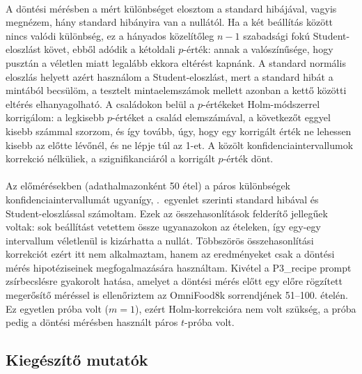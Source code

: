 \paragraph{}A döntési mérésben a mért különbséget elosztom a standard hibájával, 
vagyis megnézem, hány standard hibányira van a nullától. Ha a két beállítás 
között nincs valódi különbség, ez a hányados közelítőleg $n-1$ szabadsági fokú 
Student-eloszlást követ, ebből adódik a kétoldali $p$-érték: annak a 
valószínűsége, hogy pusztán a véletlen miatt legalább ekkora eltérést kapnánk. 
A standard normális eloszlás helyett azért használom a Student-eloszlást, mert a 
standard hibát a mintából becsülöm, a tesztelt mintaelemszámok mellett azonban a 
kettő közötti eltérés elhanyagolható. A családokon belül a $p$-értékeket 
Holm-módszerrel korrigálom: a legkisebb $p$-értéket a család elemszámával, a 
következőt eggyel kisebb számmal szorzom, és így tovább, úgy, hogy egy korrigált 
érték ne lehessen kisebb az előtte lévőnél, és ne lépje túl az 1-et. A közölt 
konfidenciaintervallumok korrekció nélküliek, a szignifikanciáról a korrigált 
$p$-érték dönt.

\paragraph{}Az előmérésekben (adathalmazonként 50 étel) a páros különbségek konfidenciaintervallumát 
ugyanígy, \az{\ref{eq:se_arany}}.~egyenlet szerinti standard hibával és Student-eloszlással 
számoltam. Ezek az összehasonlítások felderítő jellegűek voltak: sok beállítást 
vetettem össze ugyanazokon az ételeken, így egy-egy intervallum véletlenül is 
kizárhatta a nullát. Többszörös összehasonlítási korrekciót ezért itt nem 
alkalmaztam, hanem az eredményeket csak a döntési mérés hipotéziseinek 
megfogalmazására használtam.
Kivétel a P3\_recipe prompt zsírbecslésre gyakorolt hatása, amelyet a döntési 
mérés előtt egy előre rögzített megerősítő méréssel is ellenőriztem az 
OmniFood8k sorrendjének 51--100. ételén. Ez egyetlen próba volt ($m = 1$), 
ezért Holm-korrekcióra nem volt szükség, a próba pedig a döntési mérésben használt 
páros $t$-próba volt.

\subsection{Kiegészítő mutatók}
\label{sec:kiegeszito}

